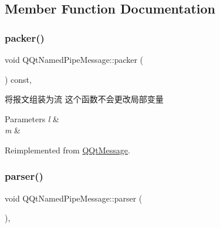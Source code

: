 \subsection{Member Function Documentation}
\mbox{\label{class_q_qt_named_pipe_message_a3977c2f52260318380edc09d2d1f7df0}} 
\subsubsection{\texorpdfstring{packer()}{packer()}}
{\footnotesize\ttfamily void Q\+Qt\+Named\+Pipe\+Message\+::packer (\begin{DoxyParamCaption}\item[{Q\+Byte\+Array \&}]{ }\end{DoxyParamCaption}) const\hspace{0.3cm}{\ttfamily [override]}, {\ttfamily [virtual]}}



将报文组装为流 这个函数不会更改局部变量 


\begin{DoxyParams}{Parameters}
{\em l} & \\
\hline
{\em m} & \\
\hline
\end{DoxyParams}


Reimplemented from \mbox{\hyperlink{class_q_qt_message_af1885c2c3628495808dca66ee8d72e14}{Q\+Qt\+Message}}.

\mbox{\label{class_q_qt_named_pipe_message_aaf7e90af917029afb616efc4d8141073}} 
\subsubsection{\texorpdfstring{parser()}{parser()}}
{\footnotesize\ttfamily void Q\+Qt\+Named\+Pipe\+Message\+::parser (\begin{DoxyParamCaption}\item[{const Q\+Byte\+Array \&}]{ }\end{DoxyParamCaption})\hspace{0.3cm}{\ttfamily [override]}, {\ttfamily [virtual]}}



